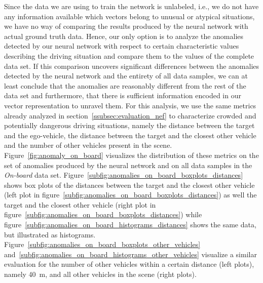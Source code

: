 Since the data we are using to train the network is unlabeled, i.e., we do not have any information available which vectors belong to unusual or atypical situations, we have no way of comparing the results produced by the neural network with actual ground truth data.
Hence, our only option is to analyze the anomalies detected by our neural network with respect to certain characteristic values describing the driving situation and compare them to the values of the complete data set.
If this comparison uncovers significant differences between the anomalies detected by the neural network and the entirety of all data samples, we can at least conclude that the anomalies are reasonably different from the rest of the data set and furthermore, that there is sufficient information encoded in our vector representation to unravel them.
For this analysis, we use the same metrics already analyzed in section~\ref{ssubsec:evaluation_nef} to characterize crowded and potentially dangerous driving situations, namely the distance between the target and the ego-vehicle, the distance between the target and the closest other vehicle and the number of other vehicles present in the scene.
Figure~\ref{fig:anomaly_on_board} visualizes the distribution of these metrics on the set of anomalies produced by the neural network and on all data samples in the \emph{On-board} data set.
Figure~\ref{subfig:anomalies_on_board_boxplots_distances} shows box plots of the distances between the target and the closest other vehicle (left plot in figure~\ref{subfig:anomalies_on_board_boxplots_distances}) as well the target and the closest other vehicle (right plot in figure~\ref{subfig:anomalies_on_board_boxplots_distances}) while figure~\ref{subfig:anomalies_on_board_histograms_distances} shows the same data, but illustrated as histograms.
Figure~\ref{subfig:anomalies_on_board_boxplots_other_vehicles} and~\ref{subfig:anomalies_on_board_histograms_other_vehicles} visualize a similar evaluation for the number of other vehicles within a certain distance (left plots), namely \SI{40}{\meter}, and all other vehicles in the scene (right plots).

